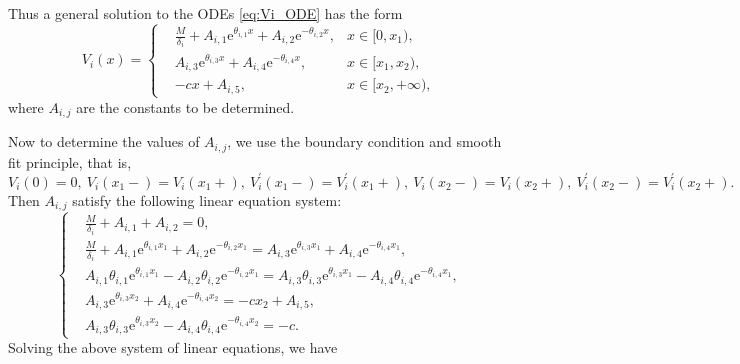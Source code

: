 \documentclass[11pt,reqno]{article}%
\numberwithin{equation}{section}
\begin{document}
Thus a general solution to the ODEs \eqref{eq:Vi_ODE} has the form
\begin{equation}\label{Vi}
V_i(x) = \left\{\begin{aligned}
& \frac{M}{\delta_i} + A_{i,1} \mathrm{e}^{\theta_{i,1}x} + A_{i,2} \mathrm{e}^{-\theta_{i,2}x}, & x \in [0, x_1),\\
& A_{i,3} \mathrm{e}^{\theta_{i,3} x} + A_{i,4} \mathrm{e}^{-\theta_{i,4}x}, & x \in [x_1, x_2),\\
& -cx + A_{i,5}, \qquad & x \in [x_2, +\infty),
\end{aligned}\right.
\end{equation}
where $A_{i,j}$ are the constants to be determined.

Now to determine the values of $A_{i,j}$, we use the boundary condition and smooth fit principle, that is,
\begin{equation}\nonumber
V_i(0) = 0,\ V_i(x_1 -) = V_i(x_1+), \ V^\prime_i(x_1 -) = V^\prime_i(x_1+),\ V_i(x_2 -) = V_i(x_2+),\ V^\prime_i(x_2 -) = V^\prime_i(x_2+).
\end{equation}
Then $A_{i,j}$ satisfy the following linear equation system:
\begin{equation}\nonumber
\left\{\begin{aligned}
& \frac{M}{\delta_i} + A_{i,1} + A_{i,2} = 0, \\
& \frac{M}{\delta_i} + A_{i,1} \mathrm{e}^{\theta_{i,1}x_1} + A_{i,2} \mathrm{e}^{-\theta_{i,2}x_1} = A_{i,3} \mathrm{e}^{\theta_{i,3}x_1} + A_{i,4} \mathrm{e}^{-\theta_{i,4}x_1}, \\
& A_{i,1} \theta_{i,1} \mathrm{e}^{\theta_{i,1}x_1} - A_{i,2} \theta_{i,2} \mathrm{e}^{-\theta_{i,2}x_1} = A_{i,3} \theta_{i,3} \mathrm{e}^{\theta_{i,3}x_1} - A_{i,4} \theta_{i,4} \mathrm{e}^{-\theta_{i,4}x_1}, \\
& A_{i,3} \mathrm{e}^{\theta_{i,3}x_2} + A_{i,4} \mathrm{e}^{-\theta_{i,4}x_2} = -cx_2 + A_{i,5},\\
& A_{i,3}\theta_{i,3} \mathrm{e}^{\theta_{i,3}x_2} - A_{i,4} \theta_{i,4}\mathrm{e}^{-\theta_{i,4}x_2}  = -c.
\end{aligned}\right.
\end{equation}
Solving the above system of linear equations, we have
\end{document}
